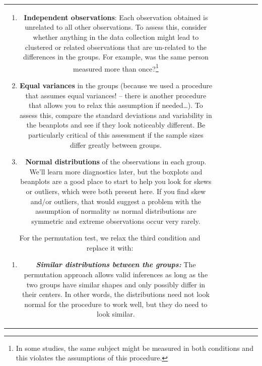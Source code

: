 \documentclass[]{book}
\newenvironment{Shaded}{\begin{snugshade}}{\end{snugshade}}
\providecommand{\tightlist}{%
  \setlength{\itemsep}{0pt}\setlength{\parskip}{0pt}}
\let\rmarkdownfootnote\footnote%
\def\footnote{\protect\rmarkdownfootnote}
\theoremstyle{definition}
\theoremstyle{definition}
\theoremstyle{remark}
\begin{document}
\begin{longtable}[]{@{}ccccccc@{}}
\begin{minipage}[b]{0.10\columnwidth}
\begin{Shaded}
\begin{Highlighting}[]
\begin{Shaded}
\begin{Highlighting}[]
\begin{enumerate}
\def\labelenumi{\arabic{enumi}.}
\item
  \textbf{Independent observations}: Each observation obtained is
  unrelated to all other observations. To assess this, consider whether
  anything in the data collection might lead to clustered or related
  observations that are un-related to the differences in the groups. For
  example, was the same person measured more than once?\footnote{In some
    studies, the same subject might be measured in both conditions and
    this violates the assumptions of this procedure.}
\item
  \textbf{Equal variances} in the groups (because we used a procedure
  that assumes equal variances! -- there is another procedure that
  allows you to relax this assumption if needed\ldots{}). To assess
  this, compare the standard deviations and variability in the beanplots
  and see if they look noticeably different. Be particularly critical of
  this assessment if the sample sizes differ greatly between groups.
\item
  \textbf{Normal distributions} of the observations in each group. We'll
  learn more diagnostics later, but the boxplots and beanplots are a
  good place to start to help you look for skews or outliers, which were
  both present here. If you find skew and/or outliers, that would
  suggest a problem with the assumption of normality as normal
  distributions are symmetric and extreme observations occur very
  rarely.
\end{enumerate}

For the permutation test, we relax the third condition and replace it
with:

\begin{enumerate}
\def\labelenumi{\arabic{enumi}.}
\setcounter{enumi}{2}
\tightlist
\item
  \textbf{\emph{Similar distributions between the groups:}} The
  permutation approach allows valid inferences as long as the two groups
  have similar shapes and only possibly differ in their centers. In
  other words, the distributions need not look normal for the procedure
  to work well, but they do need to look similar.
\end{enumerate}


\end{Highlighting}
\end{Shaded}
\end{Highlighting}
\end{Shaded}
\end{minipage}
\end{longtable}
\end{document}
